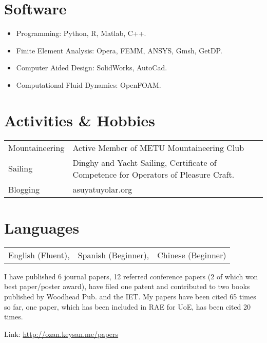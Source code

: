 \documentclass[a4paper,12pt]{article}
\begin{document}
\section{Software}
\begin{itemize}
\item Programming: Python, R, Matlab, C++.
\item Finite Element Analysis: Opera, FEMM, ANSYS, Gmsh, GetDP.
\item Computer Aided Design: SolidWorks, AutoCad.
\item Computational Fluid Dynamics: OpenFOAM.
\end{itemize}

\section{Activities \& Hobbies}
\begin{tabular}{ll}
Mountaineering & Active Member of METU Mountaineering Club\\
Sailing & Dinghy and Yacht Sailing, Certificate of Competence for Operators of Pleasure Craft. \\
Blogging & asuyatuyolar.org\\
\end{tabular}

\section{Languages}
\begin{tabular}{lll} 
English (Fluent), & Spanish (Beginner), & Chinese (Beginner)
\end{tabular}


\begin{publications}

I have published 6 journal papers, 12 referred conference papers (2 of which won best paper/poster award), have filed one patent and contributed to two books published by Woodhead Pub. and the IET. My papers have been cited 65 times so far, one paper, which has been included in RAE for UoE, has been cited 20 times.

Link: \url{http://ozan.keysan.me/papers}

\end{publications}


\end{document}
